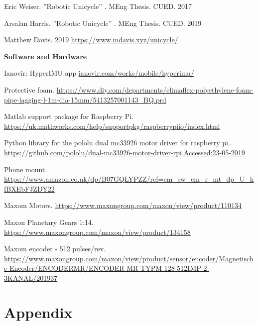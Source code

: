 \documentclass[twoside,twocolumn,12pt]{article}
\begin{document}
\begin{thebibliography}{56}
Eric Weiser. ''Robotic Unicycle'' . MEng Thesis. CUED. 2017

Arsalan Harris. ''Robotic Unicycle'' . MEng Thesis. CUED. 2019
 
Matthew Davis. 2019 \url{https://www.mdavis.xyz/unicycle/}



\phantom{please be invisible}
\centerline{\bfseries Software and Hardware} 

Ianovir: HyperIMU app 
\url{ianovir.com/works/mobile/hyperimu/}

Protective foam. \url{https://www.diy.com/departments/climaflex-polyethylene-foam-pipe-lagging-l-1m-dia-15mm/5413257001143_BQ.prd}

Matlab support package for Raspberry Pi. \url{https://uk.mathworks.com/help/supportpkg/raspberrypiio/index.html}

Python library for the pololu dual mc33926 motor driver for raspberry pi.. \url{https://github.com/pololu/dual-mc33926-motor-driver-rpi.Accessed:23-05-2019}

Phone mount. \url{https://www.amazon.co.uk/dp/B07GQLYPZZ/ref=cm_sw_em_r_mt_dp_U_hfBXEbFJZDY22}

Maxom Motors. \url{https://www.maxongroup.com/maxon/view/product/110134}

Maxon Planetary Gears 1:14. \url{https://www.maxongroup.com/maxon/view/product/134158}

Maxom encoder - 512 pulses/rev. \url{https://www.maxongroup.com/maxon/view/product/sensor/encoder/Magnetische-Encoder/ENCODERMR/ENCODER-MR-TYPM-128-512IMP-2-3KANAL/201937}

\end{thebibliography}



\clearpage
\section{Appendix}
\end{document}
